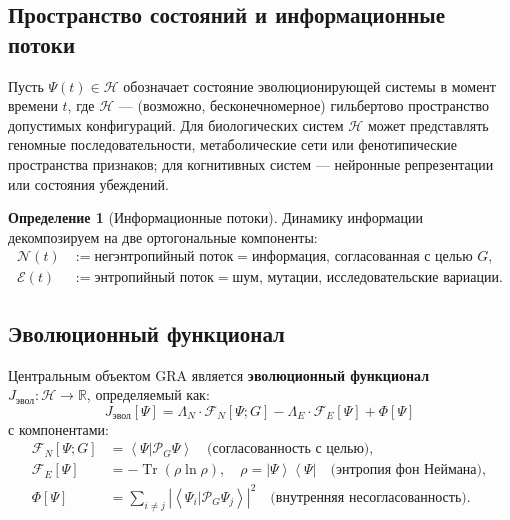 \documentclass[11pt,a4paper]{article}
\theoremstyle{plain}
\theoremstyle{definition}
\newtheorem{definition}[theorem]{Определение}
\theoremstyle{remark}
\newcommand{\Hilbert}{\mathcal{H}}
\newcommand{\NegEntropy}{\mathcal{N}}
\newcommand{\Entropy}{\mathcal{E}}
\newcommand{\Foam}{\Phi}
\newcommand{\Projector}{\mathcal{P}}
\newcommand{\Functional}{\mathcal{F}}
\newcommand{\ket}[1]{\left|#1\right\rangle}
\newcommand{\bra}[1]{\left\langle#1\right|}
\newcommand{\braket}[2]{\left\langle#1|#2\right\rangle}
\newcommand{\tr}{\operatorname{Tr}}
\newcommand{\Real}{\mathbb{R}}
\begin{document}
\subsection{Пространство состояний и информационные потоки}

Пусть $\Psi(t) \in \Hilbert$ обозначает состояние эволюционирующей системы в момент времени $t$, где $\Hilbert$ --- (возможно, бесконечномерное) гильбертово пространство допустимых конфигураций. Для биологических систем $\Hilbert$ может представлять геномные последовательности, метаболические сети или фенотипические пространства признаков; для когнитивных систем --- нейронные репрезентации или состояния убеждений.

\begin{definition}[Информационные потоки]
Динамику информации декомпозируем на две ортогональные компоненты:
\begin{align}
    \NegEntropy(t) &:= \text{негэнтропийный поток} = \text{информация, согласованная с целью } G, \label{eq:negentropy} \\
    \Entropy(t) &:= \text{энтропийный поток} = \text{шум, мутации, исследовательские вариации}. \label{eq:entropy}
\end{align}
\end{definition}

\subsection{Эволюционный функционал}

Центральным объектом GRA является \textbf{эволюционный функционал} $J_{\text{эвол}}: \Hilbert \to \Real$, определяемый как:
\begin{equation}
\boxed{
J_{\text{эвол}}[\Psi] = \Lambda_N \cdot \Functional_N[\Psi; G] - \Lambda_E \cdot \Functional_E[\Psi] + \Foam[\Psi]
}
\label{eq:J_evo}
\end{equation}
с компонентами:
\begin{align}
    \Functional_N[\Psi; G] &= \braket{\Psi}{\Projector_G \Psi} \quad \text{(согласованность с целью)}, \label{eq:F_N} \\
    \Functional_E[\Psi] &= -\tr(\rho \ln \rho), \quad \rho = \ket{\Psi}\bra{\Psi} \quad \text{(энтропия фон Неймана)}, \label{eq:F_E} \\
    \Foam[\Psi] &= \sum_{i \neq j} \left| \braket{\Psi_i}{\Projector_G \Psi_j} \right|^2 \quad \text{(внутренняя несогласованность)}. \label{eq:foam}
\end{align}
\end{document}
